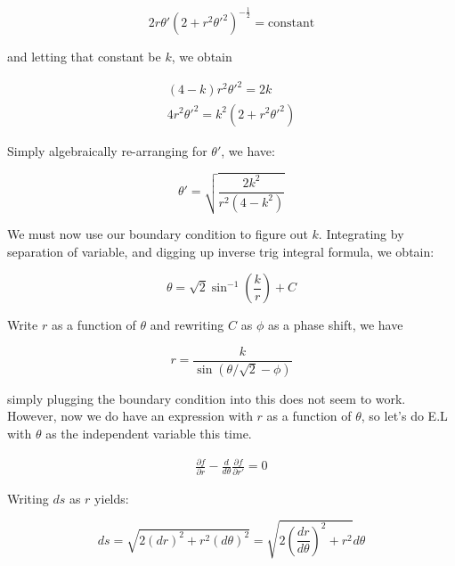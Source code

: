 \documentclass{article}
\numberwithin{equation}{section}
\begin{document}
\begin{equation}
    2 r\theta' (2 + r^2 \theta'^2)^{-\frac{1}{2}} = \text{constant}
\end{equation}

and letting that constant be $k$, we obtain

\begin{equation}
\begin{split}
(4-k) r^2 \theta'^2 = 2 k \\
4 r^2 \theta'^2 = k^2 (2+ r^2 \theta'^2)
\end{split}
\end{equation}

Simply algebraically re-arranging for $\theta'$, we have:

\begin{equation}
    \theta' = \sqrt{\frac{2k^2}{r^2(4-k^2)}}
\end{equation}

We must now use our boundary condition to figure out $k$. Integrating by separation of variable, and digging up inverse trig integral formula, we obtain:

\begin{equation}
    \theta = \sqrt{2} \sin^{-1} (\frac{k}{r}) + C
\end{equation}

Write $r$ as a function of $\theta$ and rewriting $C$ as $\phi$ as a phase shift, we have

\begin{equation}
    r = \frac{k}{\sin(\theta/\sqrt{2} - \phi)} 
\end{equation}

simply plugging the boundary condition into this does not seem to work. However, now we do have an expression with $r$ as a function of $\theta$, so let's do E.L with $\theta$ as the independent variable this time. 

\begin{equation}
    \begin{split}
        \frac{\partial f}{\partial r} - \frac{d}{d\theta} \frac{\partial f}{\partial r'} = 0
    \end{split}
\end{equation}

Writing $ds$ as $r$ yields:

\begin{equation}
    ds = \sqrt{ 2(dr)^2 + r^2(d\theta)^2} = \sqrt{2 (\frac{dr}{d\theta})^2 + r^2} d \theta
\end{equation}
\end{document}
